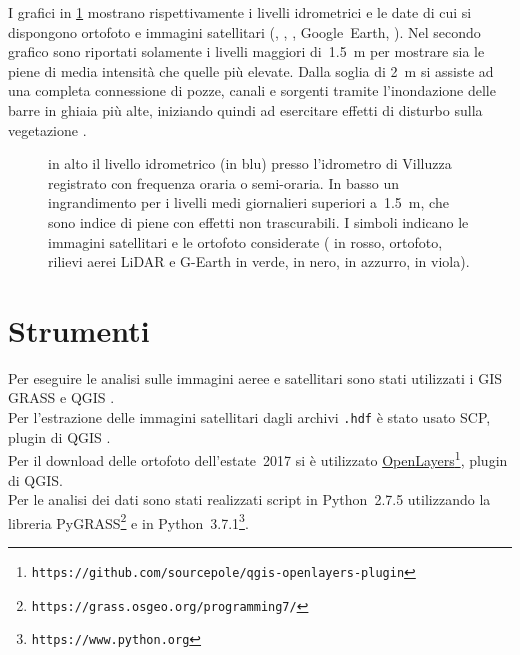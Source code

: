I grafici in \cref{graph:livelli-orto-sat} mostrano rispettivamente i livelli idrometrici e le date di cui si dispongono ortofoto e immagini satellitari (\AST{}, \Pl{}, \Se{}, Google~Earth, \WV{}). 
Nel secondo grafico sono riportati solamente i livelli maggiori di~\SI{1.5}{\m} per mostrare sia le piene di media intensità che quelle più elevate.
Dalla soglia di \SI{2}{\m} si assiste ad una completa connessione di pozze, canali e sorgenti tramite l'inondazione delle barre in ghiaia più alte, iniziando quindi ad esercitare effetti di disturbo sulla vegetazione .
%
\begin{figure}
	\centering
	
	
	\caption[livelli idrometrici e foto aeree - satellitari]{in alto il livello idrometrico (in blu) presso l'idrometro di Villuzza registrato con frequenza oraria o semi-oraria. 
	In basso un ingrandimento per i livelli medi giornalieri superiori a~\SI{1.5}{\m}, che sono indice di piene con effetti non trascurabili.
	I simboli indicano le immagini satellitari e le ortofoto considerate (\AST{} in rosso, ortofoto, rilievi aerei LiDAR e G-Earth in verde, \Pl{} in nero, \Se{} in azzurro, \WV{} in viola).}
	\label{graph:livelli-orto-sat}
\end{figure}



\section{Strumenti}
Per eseguire le analisi sulle immagini aeree e satellitari sono stati utilizzati i GIS GRASS  e QGIS . 
\\
Per l'estrazione delle immagini satellitari \AST{} dagli archivi \texttt{.hdf} è stato usato SCP, plugin di QGIS . 
\\
Per il download delle ortofoto dell'estate~2017 si è utilizzato \href{https://github.com/sourcepole/qgis-openlayers-plugin}{OpenLayers}\footnote{\texttt{https://github.com/sourcepole/qgis-openlayers-plugin}}, plugin di QGIS.
\\
Per le analisi dei dati sono stati realizzati script in Python~2.7.5 utilizzando la libreria PyGRASS\footnote{\texttt{https://grass.osgeo.org/programming7/}}  e in Python~3.7.1\footnote{\texttt{https://www.python.org}}.
